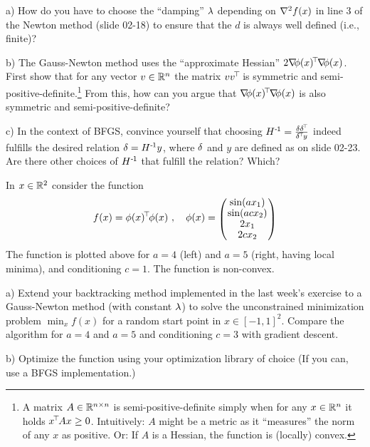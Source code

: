 

\renewcommand{\course}{Optimization}
\renewcommand{\coursepicture}{optim}
\renewcommand{\coursedate}{Summer 2015}
\renewcommand{\exnum}{3}

\exercises



a) How do you have to choose the ``damping'' $\lambda$ depending on ${\nabla_{\!\!}^2}
f(x)$ in line 3 of the Newton method (slide 02-18) to ensure that the
$d$ is always well defined (i.e., finite)?

b) The Gauss-Newton method uses the ``approximate Hessian''
$2{\nabla_{\!\!}}\phi(x)^{\!\top\!} {\nabla_{\!\!}}\phi(x)$. First show that for any vector
$v\in{\mathbb{R}}^n$ the matrix $v v^{\!\top\!}$ is symmetric and
semi-positive-definite.\footnote{ A matrix $A\in{\mathbb{R}}^{n\times n}$ is
semi-positive-definite simply when for any $x\in{\mathbb{R}}^n$ it holds $x^{\!\top\!}
A x \ge 0$. Intuitively: $A$ might be a metric as it ``measures'' the
norm of any $x$ as positive. Or: If $A$ is a Hessian, the function is
(locally) convex.}  From this, how can you argue that
${\nabla_{\!\!}}\phi(x)^{\!\top\!} {\nabla_{\!\!}}\phi(x)$ is also symmetric and
semi-positive-definite?

c) In the context of BFGS, convince yourself that choosing $H^{{\hspace*{-.0pt}\text{\rm -}\hspace*{-.5pt}}1}
= \frac{\delta \delta^{\!\top\!}}{\delta^{\!\top\!} y}$ indeed fulfills the desired relation $\delta =
H^{{\hspace*{-.0pt}\text{\rm -}\hspace*{-.5pt}}1} y$, where $\delta$ and $y$ are defined as on slide 02-23. Are there other
choices of $H^{{\hspace*{-.0pt}\text{\rm -}\hspace*{-.5pt}}1}$ that fulfill the relation? Which?





In $x\in{\mathbb{R}}^2$ consider the function
$$f(x) = \phi(x)^\T \phi(x) \comma \phi(x) = \mat{c}{
\sin(a x_1) \\
\sin(a c x_2) \\
2x_1 \\
2c x_2
}$$
The function is plotted above for $a=4$ (left) and $a=5$ (right,
having local minima), and conditioning $c=1$. The function is
non-convex.

a) Extend your backtracking method implemented in the last week's exercise
to a Gauss-Newton method (with constant $\lambda$) to solve the unconstrained
minimization problem $\min_x f(x)$ for a random start point in
$x\in[-1,1]^2$. Compare the algorithm for $a=4$ and $a=5$ and
conditioning $c=3$ with gradient descent.

b) Optimize the function using your optimization library of choice (If you can,
use a BFGS implementation.)

\exerfoot
